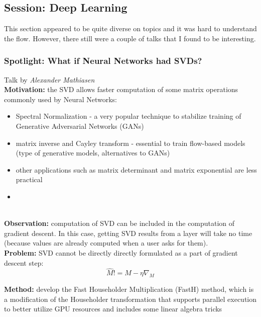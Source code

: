 \subsection{Session: Deep Learning}

This section appeared to be quite diverse on topics and it was hard to understand the flow. However, there still were a couple of talks that I found to be interesting.

\spacerule
\subsubsection{Spotlight: What if Neural Networks had SVDs? \cite{mathiasen2020neural}}

Talk by \textit{Alexander Mathiasen} \\

{\bf Motivation:} the SVD allows faster computation of some matrix operations commonly used by Neural Networks: 
\begin{itemize}
  \item Spectral Normalization \cite{MiyatoKKY18} - a very popular technique to stabilize training of Generative Adversarial Networks (GANs)
  \item matrix inverse and Cayley transform - essential to train flow-based models (type of generative models, alternatives to GANs) \cite{kingma2018glow}
  \item other applications such as matrix determinant and matrix exponential are less practical
  \item 
\end{itemize} \\

{\bf Observation:} computation of SVD can be included in the computation of gradient descent. 
In this case, getting SVD results from a layer will take no time (because values are already computed when a user asks for them). \\

{\bf Problem:} SVD cannot be directly directly formulated as a part of gradient descent step: 
\begin{equation} 
  \hat{M} != M - \eta\nabla_{M}
\end{equation} 

{\bf Method:} develop the Fast Householder Multiplication (FastH) method, which is a modification of the Householder transformation that supports parallel execution to better utilize GPU resources and includes some linear algebra tricks \\

